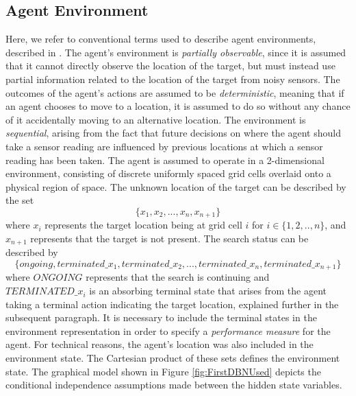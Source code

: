 \subsection{Agent Environment}
Here, we refer to conventional terms used to describe agent environments, described in \cite[p.~41]{AIAMA}. The agent's environment is \textit{partially observable}, since it is assumed that it cannot directly observe the location of the target, but must instead use partial information related to the location of the target from noisy sensors. The outcomes of the agent's actions are assumed to be \textit{deterministic}, meaning that if an agent chooses to move to a location, it is assumed to do so without any chance of it accidentally moving to an alternative location. The environment is \textit{sequential}, arising from the fact that future decisions on where the agent should take a sensor reading are influenced by previous locations at which a sensor reading has been taken. The agent is assumed to operate in a 2-dimensional environment, consisting of discrete uniformly spaced grid cells overlaid onto a physical region of space.
The unknown location of the target can be described by the set
\[\{x_1, x_2, ..., x_n, x_{n+1}\}\]
where $x_i$ represents the target location being at grid cell $i$ for $i \in \{1, 2, .., n\}$, and $x_{n+1}$ represents that the target is not present. The search status can be described by 
\[ \{ongoing, terminated\_x_1, terminated\_x_2, ..., terminated\_x_n, terminated\_x_{n+1}\} \]
where $ONGOING$ represents that the search is continuing and $TERMINATED\_x_i$ is an absorbing terminal state that arises from the agent taking a terminal action indicating the target location, explained further in the subsequent paragraph. It is necessary to include the terminal states in the environment representation in order to specify a \textit{performance measure} for the agent. For technical reasons, the agent's location was also included in the environment state. The Cartesian product of these sets defines the environment state. The graphical model shown in Figure \ref{fig:FirstDBNUsed} depicts the conditional independence assumptions made between the hidden state variables.
